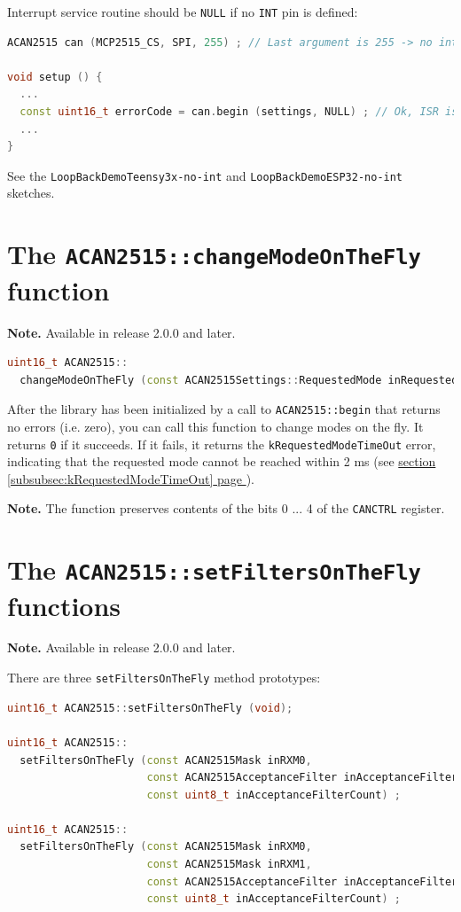 \documentclass[10pt, a4paper, obeyspaces]{extarticle}
\newcommand \sectionLabel[2]{\section{#1}\label{sec:#2}}
\newcommand\refSubsubsectionPage[1]{\hyperref[subsubsec:#1]{section \ref*{subsubsec:#1} page \pageref{subsubsec:#1}}}
\begin{document}
Interrupt service routine should be \texttt{NULL} if no \texttt{INT} pin is defined:
{ \small\begin{lstlisting}[language=c++]
ACAN2515 can (MCP2515_CS, SPI, 255) ; // Last argument is 255 -> no interrupt pin

void setup () {
  ...
  const uint16_t errorCode = can.begin (settings, NULL) ; // Ok, ISR is null
  ...
}
\end{lstlisting}}

See the \texttt{LoopBackDemoTeensy3x-no-int} and \texttt{LoopBackDemoESP32-no-int} sketches.













\sectionLabel{The \texttt{ACAN2515::changeModeOnTheFly} function}{changeModeOnTheFlyFunction}

{\bf Note. } Available in release 2.0.0 and later.

{ \small\begin{lstlisting}[language=c++]
uint16_t ACAN2515::
  changeModeOnTheFly (const ACAN2515Settings::RequestedMode inRequestedMode);
\end{lstlisting}}

After the library has been initialized by a call to \texttt{ACAN2515::begin} that returns no errors (i.e. zero), you can call this function to change modes on the fly. It returns \texttt{0} if it succeeds. If it fails, it returns the \texttt{kRequestedModeTimeOut} error, indicating that the requested mode cannot be reached within 2 ms (see \refSubsubsectionPage{kRequestedModeTimeOut}).

{\bf Note. } The function preserves contents of the bits 0 ... 4 of the \texttt{CANCTRL} register.
















\sectionLabel{The \texttt{ACAN2515::setFiltersOnTheFly} functions}{setFiltersOnTheFlyFunction}

{\bf Note. } Available in release 2.0.0 and later.

There are three \texttt{setFiltersOnTheFly} method prototypes:

{ \small\begin{lstlisting}[language=c++]
uint16_t ACAN2515::setFiltersOnTheFly (void);

uint16_t ACAN2515::
  setFiltersOnTheFly (const ACAN2515Mask inRXM0,
                      const ACAN2515AcceptanceFilter inAcceptanceFilters [],
                      const uint8_t inAcceptanceFilterCount) ;

uint16_t ACAN2515::
  setFiltersOnTheFly (const ACAN2515Mask inRXM0,
                      const ACAN2515Mask inRXM1,
                      const ACAN2515AcceptanceFilter inAcceptanceFilters [],
                      const uint8_t inAcceptanceFilterCount) ;
\end{lstlisting}}
\end{document}
